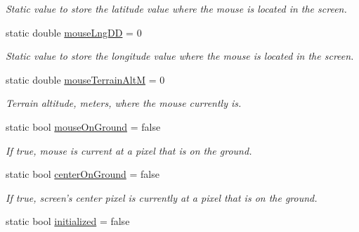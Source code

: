 \begin{DoxyCompactItemize}
\begin{DoxyCompactList}\small\item\em Static value to store the latitude value where the mouse is located in the screen. \end{DoxyCompactList}\item 
\hypertarget{class_viewer3_d_ab1a0b3763a6567c3e4acaf1e36b99bce}{
static double \hyperlink{class_viewer3_d_ab1a0b3763a6567c3e4acaf1e36b99bce}{mouseLngDD} = 0}
\label{class_viewer3_d_ab1a0b3763a6567c3e4acaf1e36b99bce}

\begin{DoxyCompactList}\small\item\em Static value to store the longitude value where the mouse is located in the screen. \end{DoxyCompactList}\item 
\hypertarget{class_viewer3_d_a6371968bde0f5fed2dccdf8d9075a2b0}{
static double \hyperlink{class_viewer3_d_a6371968bde0f5fed2dccdf8d9075a2b0}{mouseTerrainAltM} = 0}
\label{class_viewer3_d_a6371968bde0f5fed2dccdf8d9075a2b0}

\begin{DoxyCompactList}\small\item\em Terrain altitude, meters, where the mouse currently is. \end{DoxyCompactList}\item 
\hypertarget{class_viewer3_d_a9cdb4fff44a1360a840b0f1570b4f290}{
static bool \hyperlink{class_viewer3_d_a9cdb4fff44a1360a840b0f1570b4f290}{mouseOnGround} = false}
\label{class_viewer3_d_a9cdb4fff44a1360a840b0f1570b4f290}

\begin{DoxyCompactList}\small\item\em If true, mouse is current at a pixel that is on the ground. \end{DoxyCompactList}\item 
\hypertarget{class_viewer3_d_a7d59f3c310260ee6df23a998872b0bb4}{
static bool \hyperlink{class_viewer3_d_a7d59f3c310260ee6df23a998872b0bb4}{centerOnGround} = false}
\label{class_viewer3_d_a7d59f3c310260ee6df23a998872b0bb4}

\begin{DoxyCompactList}\small\item\em If true, screen's center pixel is currently at a pixel that is on the ground. \end{DoxyCompactList}\item 
\hypertarget{class_viewer3_d_a8a2a8893df2ad619ee2f5e3b49a1af18}{
static bool \hyperlink{class_viewer3_d_a8a2a8893df2ad619ee2f5e3b49a1af18}{initialized} = false}
\label{class_viewer3_d_a8a2a8893df2ad619ee2f5e3b49a1af18}


\end{DoxyCompactItemize}
